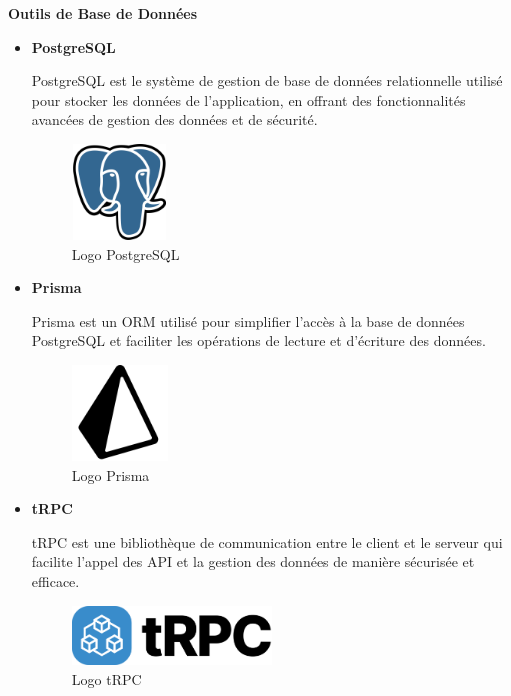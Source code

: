 \textbf{Outils de Base de Données}
\begin{itemize}
  \item \textbf{PostgreSQL}

    PostgreSQL est le système de gestion de base de données relationnelle
    utilisé pour stocker les données de l'application, en offrant des
    fonctionnalités avancées de gestion des données et de sécurité.

    \begin{figure}[H]
      \centering
      \includegraphics[width=1.0in, height=1.0in]{images/Postgresql_elephant.svg.png}
      \caption{Logo PostgreSQL}
    \end{figure}

  \item \textbf{Prisma}

    Prisma est un \ac{ORM}  utilisé pour simplifier
    l'accès à la base de données PostgreSQL et faciliter les opérations de
    lecture et d'écriture des données.
    \begin{figure}[H]
      \centering
      \includegraphics[width=1.0in, height=1.0in]{images/icons8-prisma-orm-500.png}
      \caption{Logo Prisma}
    \end{figure}

  \item \textbf{tRPC}

    tRPC est une bibliothèque de communication entre le client et le serveur
    qui facilite l'appel des API et la gestion des données de manière
    sécurisée et efficace.

    \begin{figure}[H]
      \centering
      \includegraphics[width=0.5\textwidth]{images/trpc.png}
      \caption{Logo tRPC}
    \end{figure}
\end{itemize}

